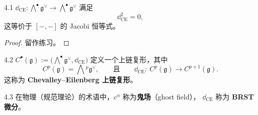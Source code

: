 

\begin{wprop}{4.1}
  $\dd_{\mathrm{CE}}:\bigwedge^{\bullet}\mathfrak g^{\vee}
  \to\bigwedge^{\bullet}\mathfrak g^{\vee}$ 满足
  \[
    \dd_{\mathrm{CE}}^2=0,
  \]
  这等价于 $[-,-]$ 的 Jacobi 恒等式。
\end{wprop}

\begin{proof}
  留作练习。
\end{proof}


\begin{wdefn}{4.2}
  $C^{\bullet}(\mathfrak g):=\bigl(\bigwedge^{\bullet}\mathfrak g^{\vee},
  \dd_{\mathrm{CE}}\bigr)$ 定义一个上链复形，其中
  \[
    C^{p}(\mathfrak g)=\bigwedge{}^{p}\mathfrak g^{\vee},
    \qquad\text{且}\qquad
    \dd_{\mathrm{CE}}:\ C^{p}(\mathfrak g)\longrightarrow C^{p+1}(\mathfrak g).
  \]
  这称为 \textbf{Chevalley--Eilenberg 上链复形}。
\end{wdefn}

\begin{wrem}{4.3}
  在物理（规范理论）的术语中，$c^{\alpha}$ 称为\textbf{鬼场}（ghost field），
  $\dd_{\mathrm{CE}}$ 称为 \textbf{BRST 微分}。
\end{wrem}

